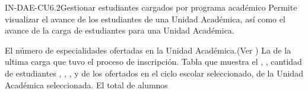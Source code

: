 \begin{UseCase}{IN-DAE-CU6.2}{Gestionar estudiantes cargados por programa académico}{
	Permite visualizar el avance de los estudiantes de una Unidad Académica, así como el avance de la carga de estudiantes para una Unidad Académica.
}
{\begin{Titemize}
			\Titem El número de especialidades ofertadas en la Unidad Académica.(Ver ) 
			\Titem La  de la ultima carga que tuvo el proceso de inscripción.	
			\Titem Tabla que muestra el , , cantidad de estudiantes , , ,  y  de los  ofertados en el ciclo escolar seleccionado, de la Unidad Académica seleccionada.
			\Titem El total de alumnos
		\end{Titemize}
	}
\end{UseCase}
